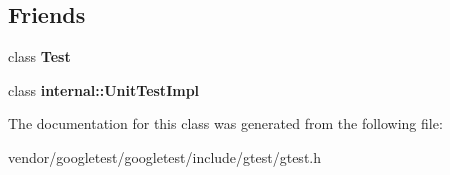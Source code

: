\subsection*{Friends}
\begin{DoxyCompactItemize}
\item 
class {\bfseries Test}\hypertarget{classtesting_1_1TestCase_a5b78b1c2e1fa07ffed92da365593eaa4}{}\label{classtesting_1_1TestCase_a5b78b1c2e1fa07ffed92da365593eaa4}

\item 
class {\bfseries internal\+::\+Unit\+Test\+Impl}\hypertarget{classtesting_1_1TestCase_acc0a5e7573fd6ae7ad1878613bb86853}{}\label{classtesting_1_1TestCase_acc0a5e7573fd6ae7ad1878613bb86853}

\end{DoxyCompactItemize}


The documentation for this class was generated from the following file\+:\begin{DoxyCompactItemize}
\item 
vendor/googletest/googletest/include/gtest/gtest.\+h\end{DoxyCompactItemize}
